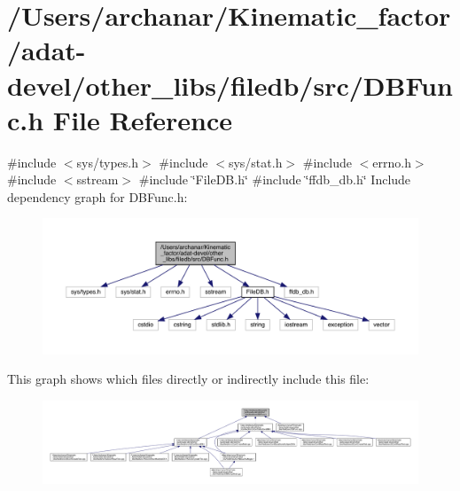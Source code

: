 \hypertarget{adat-devel_2other__libs_2filedb_2src_2DBFunc_8h}{}\section{/\+Users/archanar/\+Kinematic\+\_\+factor/adat-\/devel/other\+\_\+libs/filedb/src/\+D\+B\+Func.h File Reference}
\label{adat-devel_2other__libs_2filedb_2src_2DBFunc_8h}
{\ttfamily \#include $<$sys/types.\+h$>$}\newline
{\ttfamily \#include $<$sys/stat.\+h$>$}\newline
{\ttfamily \#include $<$errno.\+h$>$}\newline
{\ttfamily \#include $<$sstream$>$}\newline
{\ttfamily \#include \char`\"{}File\+D\+B.\+h\char`\"{}}\newline
{\ttfamily \#include \char`\"{}ffdb\+\_\+db.\+h\char`\"{}}\newline
Include dependency graph for D\+B\+Func.\+h\+:
\nopagebreak
\begin{figure}[H]
\begin{center}
\leavevmode
\includegraphics[width=350pt]{d9/d52/adat-devel_2other__libs_2filedb_2src_2DBFunc_8h__incl}
\end{center}
\end{figure}
This graph shows which files directly or indirectly include this file\+:
\nopagebreak
\begin{figure}[H]
\begin{center}
\leavevmode
\includegraphics[width=350pt]{db/dc5/adat-devel_2other__libs_2filedb_2src_2DBFunc_8h__dep__incl}
\end{center}
\end{figure}
